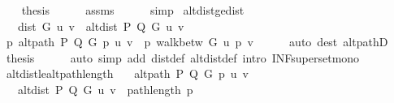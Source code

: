 \begin{isabellebody}
\ \ \isamarkupfalse%
\ {\isacharquery}{\kern0pt}thesis\isanewline
\ \ \ \ \isamarkupfalse%
\ assms\isanewline
\ \ \ \ \isamarkupfalse%
\ simp\isanewline
{}\isamarkupfalse%
%
\endisatagproof
{\isafoldproof}%
%
\isadelimproof
\isanewline
%
\endisadelimproof
%
\isadeliminvisible
\isanewline
%
\endisadeliminvisible
%
\isataginvisible
{}\isamarkupfalse%
\ alt{\isacharunderscore}{\kern0pt}dist{\isacharunderscore}{\kern0pt}ge{\isacharunderscore}{\kern0pt}dist{\isacharcolon}{\kern0pt}\isanewline
\ \ \ {\isachardoublequoteopen}dist\ G\ u\ v\ {\isasymle}\ alt{\isacharunderscore}{\kern0pt}dist\ P\ Q\ G\ u\ v{\isachardoublequoteclose}%
\endisataginvisible
{\isafoldinvisible}%
%
\isadeliminvisible
\isanewline
%
\endisadeliminvisible
%
\isadelimproof
%
\endisadelimproof
%
\isatagproof
{}\isamarkupfalse%
\ {\isacharminus}{\kern0pt}\isanewline
\ \ \isamarkupfalse%
\ {\isachardoublequoteopen}{\isacharbraceleft}{\kern0pt}p{\isachardot}{\kern0pt}\ alt{\isacharunderscore}{\kern0pt}path\ P\ Q\ G\ p\ u\ v{\isacharbraceright}{\kern0pt}\ {\isasymsubseteq}\ {\isacharbraceleft}{\kern0pt}p{\isachardot}{\kern0pt}\ walk{\isacharunderscore}{\kern0pt}betw\ G\ u\ p\ v{\isacharbraceright}{\kern0pt}{\isachardoublequoteclose}\isanewline
\ \ \ \ \isamarkupfalse%
\ {\isacharparenleft}{\kern0pt}auto\ dest{\isacharcolon}{\kern0pt}\ alt{\isacharunderscore}{\kern0pt}pathD{\isacharparenleft}{\kern0pt}{}{\isacharparenright}{\kern0pt}{\isacharparenright}{\kern0pt}\isanewline
\ \ \isamarkupfalse%
\ {\isacharquery}{\kern0pt}thesis\isanewline
\ \ \ \ \isamarkupfalse%
\ {\isacharparenleft}{\kern0pt}auto\ simp\ add{\isacharcolon}{\kern0pt}\ dist{\isacharunderscore}{\kern0pt}def\ alt{\isacharunderscore}{\kern0pt}dist{\isacharunderscore}{\kern0pt}def\ intro{\isacharcolon}{\kern0pt}\ INF{\isacharunderscore}{\kern0pt}superset{\isacharunderscore}{\kern0pt}mono{\isacharparenright}{\kern0pt}\isanewline
{}\isamarkupfalse%
%
\endisatagproof
{\isafoldproof}%
%
\isadelimproof
\isanewline
%
\endisadelimproof
\isanewline
{}\isamarkupfalse%
\ alt{\isacharunderscore}{\kern0pt}dist{\isacharunderscore}{\kern0pt}le{\isacharunderscore}{\kern0pt}alt{\isacharunderscore}{\kern0pt}path{\isacharunderscore}{\kern0pt}length{\isacharcolon}{\kern0pt}\isanewline
\ \ \ {\isachardoublequoteopen}alt{\isacharunderscore}{\kern0pt}path\ P\ Q\ G\ p\ u\ v{\isachardoublequoteclose}\isanewline
\ \ \ {\isachardoublequoteopen}alt{\isacharunderscore}{\kern0pt}dist\ P\ Q\ G\ u\ v\ {\isasymle}\ path{\isacharunderscore}{\kern0pt}length\ p{\isachardoublequoteclose}\isanewline

\end{isabellebody}
